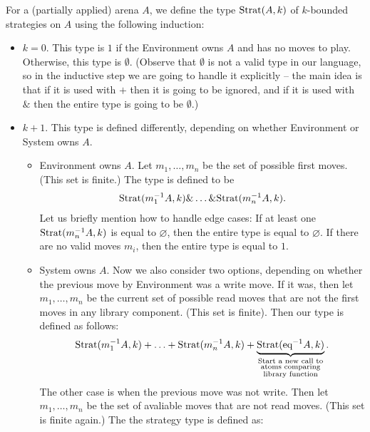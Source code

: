 \begin{definition}
    For a (partially applied) arena $A$, we define the type $\text{Strat}(A, k)$ of $k$-bounded strategies on $A$ using the following induction:
\begin{itemize}
    \item $k=0$. This type is $1$ if the Environment owns $A$ and has no moves to play. Otherwise, this type is $\emptyset$.
          (Observe that $\emptyset$ is not a valid type in our language, so in the inductive step we are going to handle it explicitly --
          the main idea is that if it is used with $+$ then it is going to be ignored,
          and if it is used with $\&$ then the entire type is going to be $\emptyset$.) 
    \item $k + 1$. This type is defined differently, depending on whether Environment or System owns $A$.
    \begin{itemize}
        \item Environment owns $A$. Let $m_1,\ldots,m_n$ be the set of possible first moves. (This set is finite.) The type is defined to be 
        \begin{align*}
            \text{Strat}(m_1^{-1}A, k) \& \ldots \& \text{Strat}(m_n^{-1}A, k).
        \end{align*}
        Let us briefly mention how to handle edge cases: If at least one $\text{Strat}(m_n^{-1}A, k)$ is equal to $\varnothing$, then 
        the entire type is equal to $\varnothing$. If there are no valid moves $m_i$, then the entire type is equal to $1$. 
        \item System owns $A$. Now we also consider two options, depending on whether the previous move by Environment was a write move. 
               If it was, then let $m_1, \ldots, m_n$ be the current set of possible read moves that are not the first moves in any library 
               component. (This set is finite). Then our type is defined as follows:
               \begin{align*}
                \text{Strat}(m_1^{-1}A, k) + \ldots + \text{Strat}(m_n^{-1}A, k) + \underbrace{\text{Strat}({\text{eq}}^{-1}A, k)}_{\substack{\textrm{Start a new call to}\\
                \textrm{atoms comparing}\\
                \textrm{library function}}}.
               \end{align*}
               The other case is when the previous move was not write. Then let $m_1, \ldots, m_n$ be the set of avaliable moves that are not read moves. 
               (This set is finite again.) The the strategy type is defined as: 

\end{itemize}
\end{itemize}
\end{definition}
